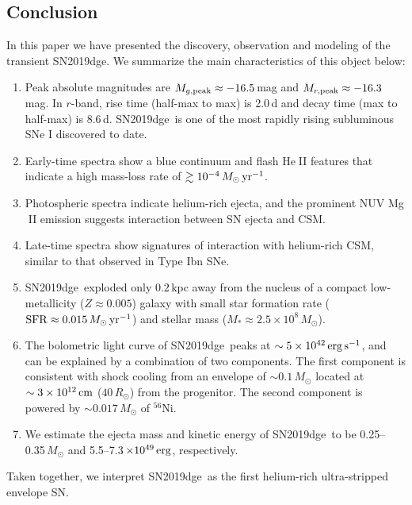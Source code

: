 \documentclass[twocolumn]{aastex63}
\newcommand{\name}{SN2019dge}
\def\ion#1#2{#1$\;${\footnotesize\rm{#2}}\relax}
\begin{document}
\begin{CJK*}{UTF8}{gbsn}
\section{Conclusion} \label{sec:conclusion}
In this paper we have presented the discovery, observation and modeling of the transient \name. We 
summarize the main characteristics of this object below:
\begin{enumerate}[label=(\alph*)]
	\item Peak absolute magnitudes are $M_{g\rm , peak}\approx -16.5$\,mag and $M_{r \rm ,peak } 
	\approx -16.3$\,mag. In $r$-band, rise time (half-max to max) is 2.0\,d and decay time (max to 
	half-max) is 8.6\,d. \name\ is one of the most rapidly rising subluminous SNe I discovered to date.
	\item Early-time spectra show a blue continuum and flash \ion{He}{II} features that indicate a 
	high mass-loss rate of $\gtrsim 10^{-4}\, M_\odot \, \rm yr^{-1}$.
	\item Photospheric spectra indicate helium-rich ejecta, and the prominent NUV \ion{Mg}{II} 
	emission suggests interaction between SN ejecta and CSM.
	\item Late-time spectra show signatures of interaction with helium-rich CSM, similar to that observed 
	in Type Ibn SNe.
	\item \name\ exploded only $0.2$\,kpc away from the nucleus of a compact low-metallicity 
	($Z\approx 0.005$) galaxy with small star formation rate (${\rm SFR}\approx 0.015\, M_\odot\, \rm 
	yr^{-1}$) and stellar 
	mass ($M_\ast \approx 2.5 \times 10^{8}\, M_\odot$).
	\item The bolometric light curve of \name\ peaks at $\sim 5 \times 10^{42}\,{\rm erg\, s^{-1}}$, 
	and can be explained by a combination of two components. The first component is consistent 
	with shock cooling from an envelope of $\sim 0.1\,M_\odot$ located at $\sim 3\times 10^{12}\, \rm 
	cm$ ($40\, R_\odot$) from the progenitor. The second component is powered by 
	$\sim 0.017\, M_\odot$ of $^{56}$Ni.
	\item We estimate the ejecta mass and kinetic energy of \name\ to be 0.25--0.35\,$M_\odot$ 
	and 5.5--7.3\,$\times10^{49}\,{\rm erg}$, respectively.
\end{enumerate}
Taken together, we interpret \name\ as the first helium-rich ultra-stripped envelope SN. 


\end{CJK*}
\end{document}
